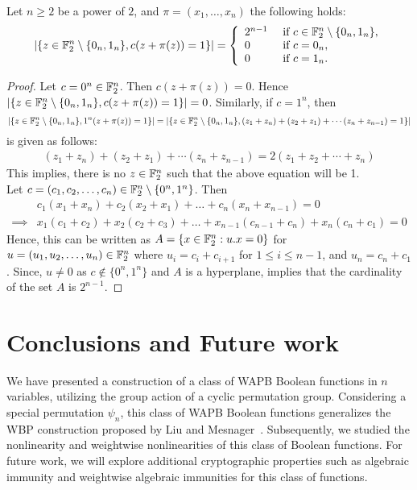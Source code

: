 \documentclass{llncs}
\begin{document}
\begin{proposition}
	Let $n\ge 2$ be a power of $2$, and $\pi= (x_1,\ldots,x_n)$ the following holds:
\[ |\{ z \in \mathbb{F}_2^{n} \setminus \{0_{n},1_{n}\},  c(z+\pi(z))=1   \}| 
= \left \{
\begin{array}{l l}
	2^{n-1}  & \text{ if } c \in \mathbb{F}_2^n \setminus \{0_n,1_n\}, \\
	0  & \text{ if } c=0_n,\\
	0 & \text{ if } c=1_n.
\end{array}\right.\]
	
\end{proposition}
\begin{proof}
	Let $ c = 0^n \in \mathbb{F}_2^n$. Then $c(z + \pi(z))=0$. Hence $|\{ z \in \mathbb{F}_2^{n} \setminus \{0_{n},1_{n}\}, c(z+\pi(z))=1   \}| = 0$. Similarly, if $c = 1^n$, then  $$|\{ z \in \mathbb{F}_2^{n} \setminus \{0_{n},1_{n}\}, 1^n(z+\pi(z))=1   \}| = |\{ z \in \mathbb{F}_2^{n} \setminus \{0_{n},1_{n}\}, (z_1 + z_n)+(z_2 + z_1)+ \cdots (z_n + z_{n-1})= 1 \}|$$ is given as follows:
	\begin{align*}
	(z_1 + z_n)+(z_2 + z_1)+ \cdots (z_n + z_{n-1}) = 2(z_1 + z_2 + \cdots + z_n) 
	\end{align*}
	This implies, there is no $z \in \mathbb{F}_2^n$ such that the above equation will be 1. \\
Let $c=(c_1,c_2,\ldots,c_n) \in \mathbb{F}_2^n \setminus \{0^n,1^n\}$. Then 
\begin{align*}
         & c_1(x_1 + x_n) + c_2(x_2 + x_1) + \ldots + c_n (x_n + x_{n-1})  = 0 \\
\implies &  x_1 ( c_1 + c_2) + x_2 (c_2 + c_3) + \ldots + x_{n-1}(c_{n-1} + c_n) + x_n(c_n + c_1)= 0  
\end{align*}
Hence, this can be written as $A= \{ x \in \mathbb{F}_2^n : u. x = 0\}$ for $ u = (u_1,u_2, \ldots,u_n) \in \mathbb{F}_2^n$ where $ u_i = c_i + c_{i+1}$ for $  1 \leq i \leq {n-1} $, and $u_n = c_n + c_1$. Since, $ u \neq 0 $ as $c \not\in \{0^n,1^n\}$ and $A$ is a hyperplane, implies that the cardinality of the set $A$ is $2^{n-1}$.
\end{proof}
\fi

\section{Conclusions and Future work}
We have presented a construction of a class of WAPB Boolean functions in $n$ variables, utilizing the group action of a cyclic permutation group. Considering a special permutation $\psi_n$, this class of WAPB Boolean functions generalizes the WBP construction proposed by Liu and Mesnager~\cite{DCC:LiuMes19}. 
Subsequently, we studied the nonlinearity and weightwise nonlinearities of this class of Boolean functions. 
For future work, we will explore additional cryptographic properties such as algebraic immunity and weightwise algebraic immunities for this class of functions.

\ifnum{}
%


\else


	
	
\end{document}
